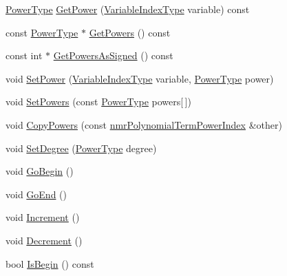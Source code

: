 \begin{DoxyCompactItemize}
\item 
\hyperlink{classnmr_polynomial_term_power_index_a2eec01c3a2c3f56f47982ceffd8e36ed}{Power\+Type} \hyperlink{classnmr_polynomial_term_power_index_ab551abf59fae5d46713430225fa5fa1c}{Get\+Power} (\hyperlink{classnmr_polynomial_term_power_index_ac982d5f82c3a95968e92d54c92cbc3e0}{Variable\+Index\+Type} variable) const 
\item 
const \hyperlink{classnmr_polynomial_term_power_index_a2eec01c3a2c3f56f47982ceffd8e36ed}{Power\+Type} $\ast$ \hyperlink{classnmr_polynomial_term_power_index_aff45ac28cb382e285968f4c478627e89}{Get\+Powers} () const 
\item 
const int $\ast$ \hyperlink{classnmr_polynomial_term_power_index_a252fcc296daeacda9430437c54b87f82}{Get\+Powers\+As\+Signed} () const 
\item 
void \hyperlink{classnmr_polynomial_term_power_index_aab9b0abdffba39e0f140755e0c3aee4f}{Set\+Power} (\hyperlink{classnmr_polynomial_term_power_index_ac982d5f82c3a95968e92d54c92cbc3e0}{Variable\+Index\+Type} variable, \hyperlink{classnmr_polynomial_term_power_index_a2eec01c3a2c3f56f47982ceffd8e36ed}{Power\+Type} power)
\item 
void \hyperlink{classnmr_polynomial_term_power_index_ab18ca045931640884b78d4fa5bddeaca}{Set\+Powers} (const \hyperlink{classnmr_polynomial_term_power_index_a2eec01c3a2c3f56f47982ceffd8e36ed}{Power\+Type} powers\mbox{[}$\,$\mbox{]})
\item 
void \hyperlink{classnmr_polynomial_term_power_index_abe622c25cb62d06d99727a78bf085f7a}{Copy\+Powers} (const \hyperlink{classnmr_polynomial_term_power_index}{nmr\+Polynomial\+Term\+Power\+Index} \&other)
\item 
void \hyperlink{classnmr_polynomial_term_power_index_ae2a29b1eecbedc0ae21af60aff06f7b2}{Set\+Degree} (\hyperlink{classnmr_polynomial_term_power_index_a2eec01c3a2c3f56f47982ceffd8e36ed}{Power\+Type} degree)
\item 
void \hyperlink{classnmr_polynomial_term_power_index_a6644ffd886be51df4361fc1362f93b7e}{Go\+Begin} ()
\item 
void \hyperlink{classnmr_polynomial_term_power_index_a5ad06505e6e054c055912ae8f08dadb3}{Go\+End} ()
\item 
void \hyperlink{classnmr_polynomial_term_power_index_a30575b4e4da50952d9ec9159fe6c4d86}{Increment} ()
\item 
void \hyperlink{classnmr_polynomial_term_power_index_a5a690b17245bc85b3dafa91575240110}{Decrement} ()
\item 
bool \hyperlink{classnmr_polynomial_term_power_index_a898e4b569333933b7240d0b0208d4e0c}{Is\+Begin} () const 

\end{DoxyCompactItemize}
